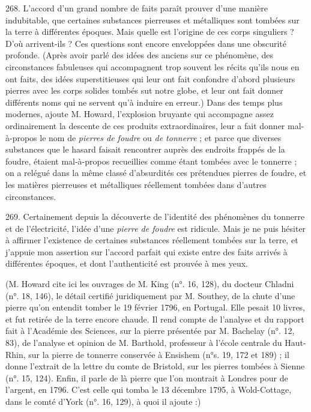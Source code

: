 \documentclass[a4paper, 11pt, oneside, polutonikogreek, french]{article}
\begin{document}
268. L'accord d'un grand nombre de faits paraît prouver d'une manière indubitable, que certaines substances pierreuses et métalliques sont tombées sur la terre à différentes époques. Mais quelle est l'origine de ces corps singuliers ? D'où arrivent-ils ? Ces questions sont encore enveloppées dans une obscurité profonde. (Après avoir parlé des idées des anciens sur ce phénomène, des circonstances fabuleuses qui accompagnent trop souvent les récits qu'ils nous en ont faits, des idées superstitieuses qui leur ont fait confondre d'abord plusieurs pierres avec les corps solides tombés sut notre globe, et leur ont fait donner différents noms qui ne servent qu'à induire en erreur.) \og Dans des temps plus modernes, ajoute M. Howard, l'explosion bruyante qui accompagne assez ordinairement la descente de ces produits extraordinaires, leur a fait donner mal-à-propos le nom de \emph{pierres de foudre} ou \emph{de tonnerre} ; et parce que diverses substances que le hasard faisait rencontrer auprès des endroits frappés de la foudre, étaient mal-à-propos recueillies comme étant tombées avec le tonnerre ; on a relégué dans la même classé d'absurdités ces prétendues pierres de foudre, et les matières pierreuses et métalliques réellement tombées dans d'autres circonstances.

269. Certainement depuis la découverte de l'identité des phénomènes du tonnerre et de l'électricité, l'idée d'une \emph{pierre de foudre} est ridicule. Mais je ne puis hésiter à affirmer l'existence de certaines substances réellement tombées sur la terre, et j'appuie mon assertion sur l'accord parfait qui existe entre des faits arrivés à différentes époques, et dont l'authenticité est prouvée à mes yeux.

(M. Howard cite ici les ouvrages de M. King (n°. 16, 128), du docteur Chladni (n°. 18, 146), le détail certifié juridiquement par M. Southey, de la chute d'une pierre qu'on entendit tomber le 19 février 1796, en Portugal. Elle pesait 10 livres, et fut retirée de la terre encore chaude. Il rend compte de l'analyse et du rapport fait à l'Académie des Sciences, sur la pierre présentée par M. Bachelay (n°. 12, 83), de l'analyse et opinion de M. Barthold, professeur à l'école centrale du Haut-Rhin, sur la pierre de tonnerre conservée à Ensishem (n°s. 19, 172 et 189) ; il donne l'extrait de la lettre du comte de Bristold, sur les pierres tombées à Sienne (n°. 15, 124). Enfin, il parle de là pierre que l'on montrait à Londres pour de l'argent, en 1796. C'est celle qui tomba le 13 décembre 1795, à Wold-Cottage, dans le comté d'York (n°. 16, 129), à quoi il ajoute :)
\end{document}
